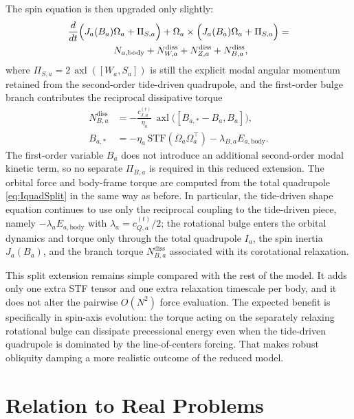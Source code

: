\documentclass[journal, a4paper]{IEEEtran}
\begin{document}
The spin equation is then upgraded only slightly:
\begin{align}
\frac{d}{dt}\Bigl(J_a(B_a)&\Omega_a + \Pi_{S,a}\Bigr)
+
\Omega_a\times\Bigl(J_a(B_a)\Omega_a + \Pi_{S,a}\Bigr)
=\nonumber \\
&N_{a,\mathrm{body}}
+
N^{\mathrm{diss}}_{W,a}
+
N^{\mathrm{diss}}_{Z,a}
+
N^{\mathrm{diss}}_{B,a},
\label{eq:spinquadSplit}
\end{align}
where $\Pi_{S,a}=2\,\operatorname{axl}([W_a,S_a])$ is still the explicit modal
angular momentum retained from the second-order tide-driven quadrupole, and the
first-order bulge branch contributes the reciprocal dissipative torque
\begin{subequations}
\label{eq:NdissB}
\begin{align}
N^{\mathrm{diss}}_{B,a}
&=
-\frac{c_{J,a}^{(r)}}{\eta_a}\,
\operatorname{axl}\!\bigl([B_{a,*}-B_a,B_a]\bigr),
 \\
B_{a,*}&=-\eta_a\,\mathrm{STF}(\Omega_a\Omega_a^\top)-\lambda_{B,a}E_{a,\mathrm{body}}.
\end{align}
\end{subequations}
The first-order variable $B_a$ does not introduce an additional second-order
modal kinetic term, so no separate $\Pi_{B,a}$ is required in this reduced
extension. The orbital force and body-frame torque are computed from the total
quadrupole \eqref{eq:IquadSplit} in the same way as before. In particular, the
tide-driven shape equation continues to use only the reciprocal coupling to the
tide-driven piece, namely $-\lambda_a E_{a,\mathrm{body}}$ with
$\lambda_a=c_{Q,a}^{(t)}/2$; the rotational bulge enters the orbital dynamics
and torque only through the total quadrupole $I_a$, the spin inertia
$J_a(B_a)$, and the branch torque $N^{\mathrm{diss}}_{B,a}$ associated with its
corotational relaxation.

This split extension remains simple compared with the rest of the model. It
adds only one extra STF tensor and one extra relaxation timescale per body, and
it does not alter the pairwise $O(N^2)$ force evaluation. The expected benefit
is specifically in spin-axis evolution: the torque acting on the separately
relaxing rotational bulge can dissipate precessional energy even when the
tide-driven quadrupole is dominated by the line-of-centers forcing. That makes
robust obliquity damping a more realistic outcome of the reduced model.

\section{Relation to Real Problems}
\end{document}
